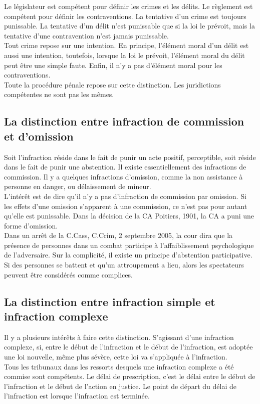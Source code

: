 \documentclass[10pt, a4paper, openany]{book}
\begin{document}
Le législateur est compétent pour définir les crimes et les délits. Le règlement est compétent pour définir les contraventions. La tentative d'un crime est toujours punissable. La tentative d'un délit n'est punissable que si la loi le prévoit, mais la tentative d'une contravention n'est jamais punissable. \\
Tout crime repose sur une intention. En principe, l'élément moral d'un délit est aussi une intention, toutefois, lorsque la loi le prévoit, l'élément moral du délit peut être une simple faute. Enfin, il n'y a pas d'élément moral pour les contraventions. \\
Toute la procédure pénale repose sur cette distinction. Les juridictions compétentes ne sont pas les mêmes. 

\subsection{La distinction entre infraction de commission et d'omission}

Soit l'infraction réside dans le fait de punir un acte positif, perceptible, soit réside dans le fait de punir une abstention. Il existe essentiellement des infractions de commission. Il y a quelques infractions d'omission, comme la non assistance à personne en danger, ou délaissement de mineur. \\
L'intérêt est de dire qu'il n'y a pas d'infraction de commission par omission. Si les effets d'une omission s'apparent à une commission, ce n'est pas pour autant qu'elle est punissable. Dans la décision de la CA Poitiers, 1901, la CA a puni une forme d'omission. \\
Dans un arrêt de la C.Cass, C.Crim, 2 septembre 2005, la cour dira que la présence de personnes dans un combat participe à l'affaiblissement psychologique de l'adversaire. Sur la complicité, il existe un principe d'abstention participative. Si des personnes se battent et qu'un attroupement a lieu, alors les spectateurs peuvent être considérés comme complices. \\

\subsection{La distinction entre infraction simple et infraction complexe}

Il y a plusieurs intérêts à faire cette distinction. S'agissant d'une infraction complexe, si, entre le début de l'infraction et le début de l'infraction, est adoptée une loi nouvelle, même plus sévère, cette loi va s'appliquée à l'infraction. \\
Tous les tribunaux dans les ressorts desquels une infraction complexe a été commise sont compétents. Le délai de prescription, c'est le délai entre le début de l'infraction et le début de l'action en justice. Le point de départ du délai de l'infraction est lorsque l'infraction est terminée.
\end{document}
